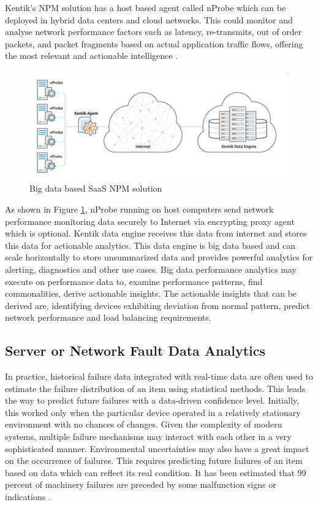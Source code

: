 \documentclass[sigconf]{acmart}
\begin{document}
Kentik's NPM solution has a host based agent called nProbe which can be deployed in hybrid data centers and cloud networks. This could monitor and analyse network performance factors such as latency, re-transmits, out of order packets, and packet fragments based on actual application traffic flows, offering the most relevant and actionable intelligence \cite{kentik-introduces-new-npm-solution}.

\begin{figure}[htb]
  \centering
  \includegraphics[width=1.0\columnwidth]{images/Figure3.png}
  \caption{Big data based SaaS NPM solution 
  \cite{big-data-network-performance-monitoring}}
  \label{fig:Figure3} 
\end{figure}

As shown in Figure \ref{fig:Figure3}, nProbe running on host computers send network performance monitoring data securely to Internet via encrypting proxy agent which is optional. Kentik data engine receives this data from internet and stores this data for actionable analytics. This data engine is big data based and can scale horizontally to store unsummarized data and provides powerful analytics for alerting, diagnostics and other use cases. Big data performance analytics may execute on performance data to, examine performance patterns, find commonalities, derive actionable insights. The actionable insights that can be derived are, identifying devices exhibiting deviation from normal pattern, predict network performance and load balancing requirements.


\subsection{Server or Network Fault Data Analytics}

In practice, historical failure data integrated with real-time data are often used to estimate the failure distribution of an item using statistical methods. This leads the way to predict future failures with a data-driven confidence level. Initially, this worked only when the particular device operated in a relatively stationary environment with no chances of changes. Given the complexity of modern systems, multiple failure mechanisms may interact with each other in a very sophisticated manner. Environmental uncertainties may also have a great impact on the occurrence of failures. This requires predicting future failures of an item based on data which can reflect its real condition. It has been estimated that 99 percent of machinery failures are preceded by some malfunction signs or indications \cite{big-data-analytics-for-fault-detection}. 
\end{document}
